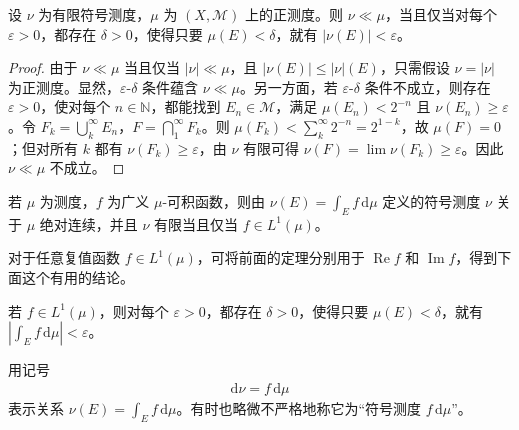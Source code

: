 \documentclass[../../main.tex]{subfiles}%
\begin{document}
\begin{theorem}\label{theorem:ch03-absolute-continuity-epsilon-delta}
设 $\nu$ 为有限符号测度，$\mu$ 为 $(X,\mathscr{M})$ 上的正测度。则 $\nu\ll\mu$，当且仅当对每个 $\varepsilon>0$，都存在 $\delta>0$，使得只要 $\mu(E)<\delta$，就有 $|\nu(E)|<\varepsilon$。
\end{theorem}
\begin{proof}
由于 $\nu\ll\mu$ 当且仅当 $|\nu|\ll\mu$，且 $|\nu(E)|\le|\nu|(E)$，只需假设 $\nu=|\nu|$ 为正测度。显然，$\varepsilon$-$\delta$ 条件蕴含 $\nu\ll\mu$。另一方面，若 $\varepsilon$-$\delta$ 条件不成立，则存在 $\varepsilon>0$，使对每个 $n\in\mathbb{N}$，都能找到 $E_n\in\mathscr{M}$，满足 $\mu(E_n)<2^{-n}$ 且 $\nu(E_n)\ge\varepsilon$。令 $F_k=\bigcup_k^\infty E_n$，$F=\bigcap_1^\infty F_k$。则 $\mu(F_k)<\sum_k^\infty2^{-n}=2^{1-k}$，故 $\mu(F)=0$；但对所有 $k$ 都有 $\nu(F_k)\ge\varepsilon$，由 $\nu$ 有限可得 $\nu(F)=\lim\nu(F_k)\ge\varepsilon$。因此 $\nu\ll\mu$ 不成立。
\end{proof}
\begin{proposition}\label{proposition:ch03-density-absolute-continuity}
若 $\mu$ 为测度，$f$ 为广义 $\mu$-可积函数，则由 $\nu(E)=\int_E f\,\mathrm{d}\mu$ 定义的符号测度 $\nu$ 关于 $\mu$ 绝对连续，并且 $\nu$ 有限当且仅当 $f\in L^1(\mu)$。
\end{proposition}
对于任意复值函数 $f\in L^1(\mu)$，可将前面的定理分别用于 $\operatorname{Re}f$ 和 $\operatorname{Im}f$，得到下面这个有用的结论。
\begin{corollary}\label{corollary:ch03-integral-absolute-continuity}
若 $f\in L^1(\mu)$，则对每个 $\varepsilon>0$，都存在 $\delta>0$，使得只要 $\mu(E)<\delta$，就有 $|\int_E f\,\mathrm{d}\mu|<\varepsilon$。
\end{corollary}
\begin{definition}[测度密度的记号]\label{definition:ch03-density-notation}
用记号
\begin{align*}
\mathrm{d}\nu=f\,\mathrm{d}\mu
\end{align*}
表示关系 $\nu(E)=\int_E f\,\mathrm{d}\mu$。有时也略微不严格地称它为“符号测度 $f\,\mathrm{d}\mu$”。
\end{definition}
\end{document}
